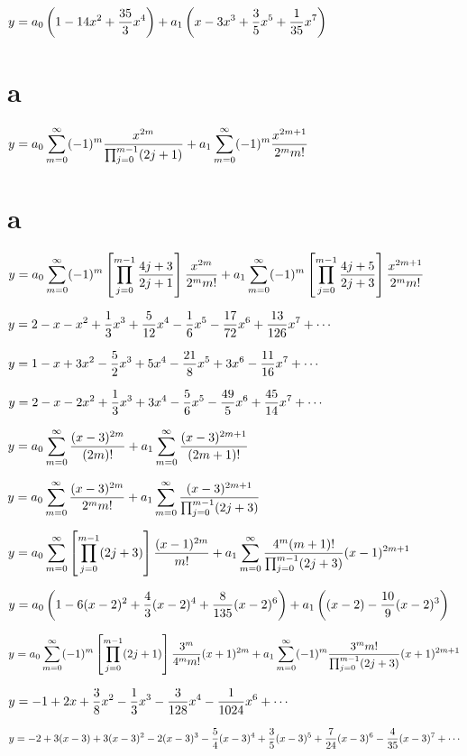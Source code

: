 $y=\displaystyle{a_0\left(1-14x^2+\frac{35}{3}x^4\right)+a_1\left(x-3x^3+\frac{3}{5}x^5
+\frac{1}{35}x^7\right)}$

 \part{a}
$y=\displaystyle{a_0\sum_{m=0}^\infty(-1)^m \frac{x^{2m}}{\prod_{j=0}^{m-1}(2j+1)}
+a_1\sum_{m=0}^\infty(-1)^m\frac{x^{2m+1}}{2^mm!}}$

 \part{a}
$y=\displaystyle{a_0\sum_{m=0}^\infty
(-1)^m\left[\prod_{j=0}^{m-1}\frac{4j+3}{2j+1}\right]\frac{x^{2m}}{2^mm!}
+a_1\sum_{m=0}^\infty
(-1)^m\left[\prod_{j=0}^{m-1}\frac{4j+5}{2j+3}\right]\frac{x^{2m+1}}{2^mm!}}$

$y=\displaystyle{2-x-x^2+\frac{1}{3}x^3+\frac{5}{12}x^4-\frac{1}{6}x^5-\frac{17}{72}x^6
+\frac{13}{126}x^7+\cdots}$

$y=\displaystyle{1-x+3x^2-\frac{5}{2}x^3+5x^4-\frac{21}{8}x^5+3x^6-\frac{11}{16}x^7+\cdots}$

$y=\displaystyle{2-x-2x^2+\frac{1}{3}x^3+3x^4-\frac{5}{6}x^5-\frac{49}{5}x^6
+\frac{45}{14}x^7+\cdots}$

$y=\displaystyle{a_0\sum_{m=0}^\infty\frac{(x-3)^{2m}}{(2m)!}+a_1\sum_{m=0}^\infty
\frac{(x-3)^{2m+1}}{(2m+1)!}}$

$y=\displaystyle{a_0\sum_{m=0}^\infty\frac{(x-3)^{2m}}{2^mm!}+a_1\sum_{m=0}^\infty
\frac{(x-3)^{2m+1}}{\prod_{j=0}^{m-1}(2j+3)}}$

$y=\displaystyle{a_0\sum_{m=0}^\infty \left[\prod_{j=0}^{m-1}(2j+3)\right]\frac{(x-1)^{2m}}{m!}+a_1\sum_{m=0}^\infty
\frac{4^m(m+1)!}{\prod_{j=0}^{m-1}(2j+3)}(x-1)^{2m+1}}$

$y=\displaystyle{a_0\left(1-6(x-2)^2+\frac{4}{3}(x-2)^4+\frac{8}{135}(x-2)^6\right)
+a_1\left((x-2)-\frac{10}{9}(x-2)^3\right)}$

$y=\displaystyle{a_0\sum_{m=0}^\infty(-1)^m\left[\prod_{j=0}^{m-1}(2j+1)\right]
\frac{3^m}{4^mm!}(x+1)^{2m}+a_1\sum_{m=0}^\infty(-1)^m\frac{3^mm!}{\prod_{j=0}^{m-1}(2j+3)}(x+1)^{2m+1}}$

$y=\displaystyle{-1+2x+\frac{3}{8}x^2-\frac{1}{3}x^3-\frac{3}{128}x^4-\frac{1}{1024}x^6+\cdots}$

$y=\displaystyle{-2+3(x-3)+3(x-3)^2-2(x-3)^3-\frac{5}{4}(x-3)^4+\frac{3}{5}(x-3)^5
+\frac{7}{24}(x-3)^6-\frac{4}{35}(x-3)^7+\cdots}$


